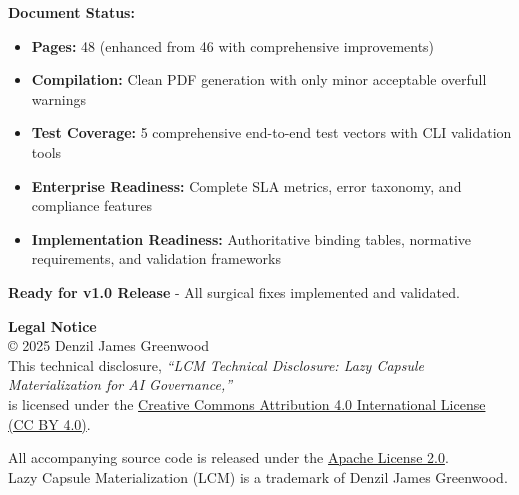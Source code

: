 \documentclass[12pt,a4paper]{article}
\begin{document}
\begin{technicalbox}
\textbf{Document Status:}
\begin{itemize}
\item \textbf{Pages:} 48 (enhanced from 46 with comprehensive improvements)
\item \textbf{Compilation:} Clean PDF generation with only minor acceptable overfull warnings
\item \textbf{Test Coverage:} 5 comprehensive end-to-end test vectors with CLI validation tools
\item \textbf{Enterprise Readiness:} Complete SLA metrics, error taxonomy, and compliance features
\item \textbf{Implementation Readiness:} Authoritative binding tables, normative requirements, and validation frameworks
\end{itemize}

\textbf{Ready for v1.0 Release} - All surgical fixes implemented and validated.
\end{technicalbox}

\begin{infobox}
\textbf{Legal Notice}\\
© 2025 Denzil James Greenwood \\
This technical disclosure, \textit{``LCM Technical Disclosure: Lazy Capsule Materialization for AI Governance,''} \\
is licensed under the \href{https://creativecommons.org/licenses/by/4.0/}{Creative Commons Attribution 4.0 International License (CC BY 4.0)}.

All accompanying source code is released under the \href{https://www.apache.org/licenses/LICENSE-2.0}{Apache License 2.0}. \\
Lazy Capsule Materialization (LCM)\texttrademark{} is a trademark of Denzil James Greenwood.
\end{infobox}
\end{document}
